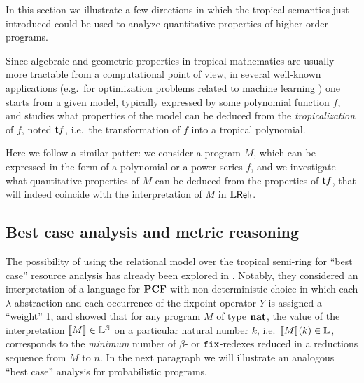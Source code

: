 

In this section we illustrate a few directions in which the tropical semantics just introduced could be used to analyze quantitative properties of higher-order programs. 

Since algebraic and geometric properties in tropical mathematics are usually more tractable from a computational point of view, in several well-known applications (e.g.~for optimization problems related to machine learning \cite{Pachter2004, Zhang2018, Maragos2021}) one starts from a given model, typically expressed by some polynomial function $f$, and studies 
what properties of the model can be deduced from the \emph{tropicalization} of $f$, noted $\mathsf{t} f$, i.e.~the transformation of $f$ into a tropical polynomial.


%
%
%


Here we follow a similar patter: we consider a program $M$, which can be expressed in the form of a polynomial or a power series $f$, and we 
investigate what quantitative properties of $M$ can be deduced from the properties of $\mathsf{t} f$, that will indeed coincide with the interpretation of $M$ in $\mathbb{L} \mathsf{Rel}_{!}$.






\subsection{Best case analysis and metric reasoning}

The possibility of using the relational model over the tropical semi-ring for ``best case'' resource analysis has already been explored in \cite{Manzo2013}. Notably, they considered an interpretation of a language for $\mathbf{PCF}$ with non-deterministic choice in which each $\lambda$-abstraction and each occurrence of the fixpoint operator $Y$ is assigned a ``weight'' 1, and showed that for any program $M$ of type $\mathbf{nat}$, 
the value of the interpretation $\llbracket M\rrbracket\in \mathbb{L}^{\mathbb{N}}$ on a particular natural number $k$, i.e.~$\llbracket M\rrbracket(k)\in \mathbb{L}$, corresponds to the \emph{minimum} number of $\beta$- or $\mathtt{fix}$-redexes reduced in a reductions sequence from $M$ to $\underline n$. 
In the next paragraph we will illustrate an analogous ``best case'' analysis for probabilistic programs.

